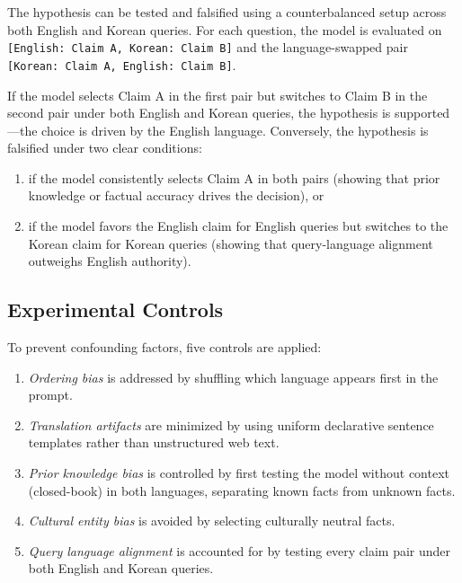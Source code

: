 The hypothesis can be tested and falsified using a counterbalanced setup across both English and Korean queries. For each question, the model is evaluated on \texttt{[English: Claim A, Korean: Claim B]} and the language-swapped pair \texttt{[Korean: Claim A, English: Claim B]}.

If the model selects Claim A in the first pair but switches to Claim B in the second pair under both English and Korean queries, the hypothesis is supported—the choice is driven by the English language. Conversely, the hypothesis is falsified under two clear conditions:

\begin{enumerate}
    \item if the model consistently selects Claim A in both pairs (showing that prior knowledge or factual accuracy drives the decision), or
    \item if the model favors the English claim for English queries but switches to the Korean claim for Korean queries (showing that query-language alignment outweighs English authority).
\end{enumerate}

\subsection{Experimental Controls}

To prevent confounding factors, five controls are applied:

\begin{enumerate}
    \item \textit{Ordering bias} is addressed by shuffling which language appears first in the prompt.
    \item \textit{Translation artifacts} are minimized by using uniform declarative sentence templates rather than unstructured web text.
    \item \textit{Prior knowledge bias} is controlled by first testing the model without context (closed-book) in both languages, separating known facts from unknown facts.
    \item \textit{Cultural entity bias} is avoided by selecting culturally neutral facts.
    \item \textit{Query language alignment} is accounted for by testing every claim pair under both English and Korean queries.
\end{enumerate}